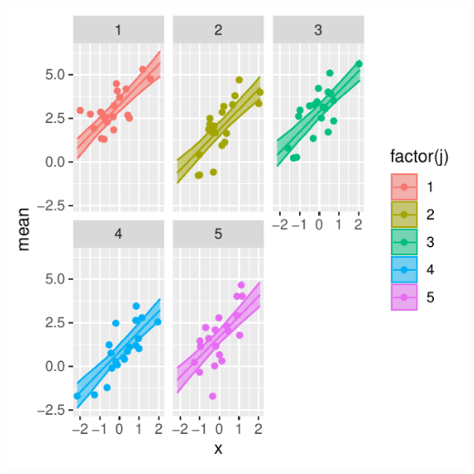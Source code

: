 \documentclass[
  letterpaper,
  DIV=11,
  numbers=noendperiod]{scrartcl}
\begin{document}
\begin{center}
\includegraphics{day1_practical_files/figure-pdf/unnamed-chunk-31-1.pdf}
\end{center}
\end{document}
